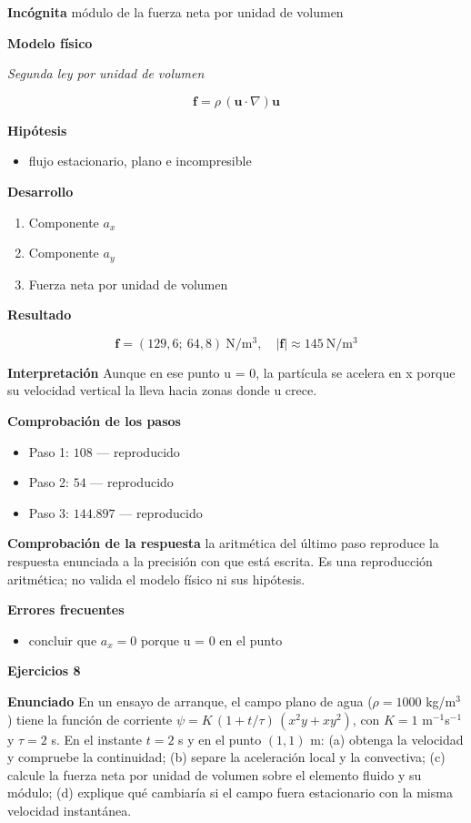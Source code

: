 \documentclass[10pt,openany]{book}
\begin{document}
\noindent\textbf{Incógnita}
módulo de la fuerza neta por unidad de volumen

\noindent\textbf{Modelo físico}

\noindent\textit{Segunda ley por unidad de volumen}

\[
\mathbf{f} = \rho\,(\mathbf{u}\cdot\nabla)\mathbf{u}
\]

\noindent\textbf{Hipótesis}
\begin{itemize}
\item flujo estacionario, plano e incompresible
\end{itemize}

\noindent\textbf{Desarrollo}
\begin{enumerate}
\item
Componente \(a_x\)
\item
Componente \(a_y\)
\item
Fuerza neta por unidad de volumen
\end{enumerate}

\noindent\textbf{Resultado}

\[
\mathbf{f} = (129{,}6;\ 64{,}8)\ \mathrm{N/m^{3}},\quad |\mathbf{f}| \approx 145\ \mathrm{N/m^{3}}
\]

\noindent\textbf{Interpretación}
Aunque en ese punto u = 0, la partícula se acelera en x porque su velocidad vertical la lleva hacia zonas donde u crece.

\noindent\textbf{Comprobación de los pasos}
\begin{itemize}
\item Paso 1: $108$ — reproducido
\item Paso 2: $54$ — reproducido
\item Paso 3: $144.897$ — reproducido
\end{itemize}

\noindent\textbf{Comprobación de la respuesta} la aritmética del último paso reproduce la respuesta enunciada a la precisión con que está escrita. Es una reproducción aritmética; no valida el modelo físico ni sus hipótesis.

\noindent\textbf{Errores frecuentes}
\begin{itemize}
\item concluir que \(a_x = 0\) porque u = 0 en el punto
\end{itemize}

\noindent\textbf{Ejercicios 8}

\noindent\textbf{Enunciado}
En un ensayo de arranque, el campo plano de agua (\(\rho = 1000\) kg/m\(^3\)) tiene la función de corriente \(\psi = K\,(1 + t/\tau)\,(x^{2}y + xy^{2})\), con \(K = 1\) m\(^{-1}\)s\(^{-1}\) y \(\tau = 2\) s. En el instante \(t = 2\) s y en el punto \((1, 1)\) m: (a) obtenga la velocidad y compruebe la continuidad; (b) separe la aceleración local y la convectiva; (c) calcule la fuerza neta por unidad de volumen sobre el elemento fluido y su módulo; (d) explique qué cambiaría si el campo fuera estacionario con la misma velocidad instantánea.
\end{document}
